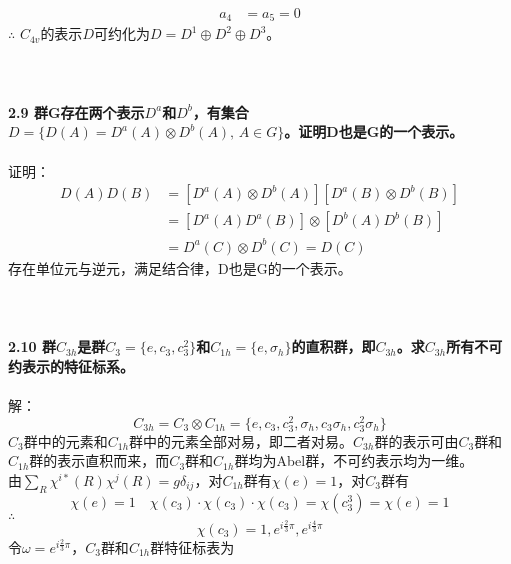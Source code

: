 \documentclass[12pt]{article}
\numberwithin{equation}{section}	 %
\begin{document}
\begin{spacing}{1.5}
\begin{align*}
a_{4} &= a_{5} = 0
\end{align*}
$\therefore$ $C_{4v}$的表示$D$可约化为$D=D^{1}\oplus D^{2}\oplus D^{3}$。\\
~\\
~\\
~\\
\textbf{2.9 \quad 群G存在两个表示$D^{a}$和$D^{b}$，有集合$D=\{D(A) = D^{a}(A) \otimes D^{b}(A), \, A \in G\}$。证明D也是G的一个表示。}\\
~\\
证明：
\begin{align*}
D(A)D(B) &= \left[D^{a}(A) \otimes D^{b}(A)\right]\left[D^{a}(B) \otimes D^{b}(B)\right] \\
&= \left[D^{a}(A) D^{a}(B)\right] \otimes \left[D^{b}(A) D^{b}(B)\right] \\
&= D^{a}(C) \otimes D^{b}(C) = D(C)
\end{align*}
存在单位元与逆元，满足结合律，D也是G的一个表示。\\
~\\
~\\
~\\
\textbf{2.10 \quad 群$C_{3h}$是群$C_{3} = \{e, c_{3}, c_{3}^{2}\}$和$C_{1h} = \{e, \sigma_{h}\}$的直积群，即$C_{3h}$。求$C_{3h}$所有不可约表示的特征标系。}\\
~\\
解：
\begin{equation}
C_{3h} = C_{3} \otimes C_{1h} = \{e, c_{3}, c_{3}^{2}, \sigma_{h}, c_{3}\sigma_{h}, c_{3}^{2}\sigma_{h}\}
\end{equation}
$C_{3}$群中的元素和$C_{1h}$群中的元素全部对易，即二者对易。$C_{3h}$群的表示可由$C_{3}$群和$C_{1h}$群的表示直积而来，而$C_{3}$群和$C_{1h}$群均为Abel群，不可约表示均为一维。\\
由$\displaystyle \sum_{R}\chi^{i*}(R)\chi^{j}(R) = g\delta_{ij}$，对$C_{1h}$群有$\chi(e) = 1$，对$C_{3}$群有
\begin{equation}
\chi(e) = 1 \quad \chi(c_{3})\cdot\chi(c_{3})\cdot\chi(c_{3}) = \chi(c_{3}^{3}) = \chi(e) = 1
\end{equation}
$\therefore$
\begin{equation}
\chi(c_{3}) = 1,e^{i\frac{2}{3}\pi},e^{i\frac{4}{3}\pi}
\end{equation}
令$\displaystyle \omega = e^{i\frac{2}{3}\pi}$，$C_{3}$群和$C_{1h}$群特征标表为 \\
~\\
\begin{minipage}{\textwidth}
	\begin{minipage}[t]{0.5\textwidth}

\end{minipage}
\end{minipage}
\end{spacing}
\end{document}

